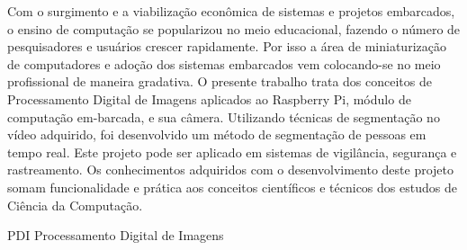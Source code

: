 \documentclass[12pt,oneside,a4paper,chapter=TITLE,section=TITLE,sumario=tradicional]{abntex2}
\begin{document}

\imprimircapa
\imprimirfolhaderosto

\begin{resumo}
Com o surgimento e a viabilização econômica de sistemas e projetos embarcados, o ensino de computação se popularizou no meio educacional, fazendo o número de pesquisadores e usuários crescer rapidamente. Por isso a área de miniaturização de computadores e adoção dos sistemas embarcados vem colocando-se no meio profissional de maneira gradativa. O presente trabalho trata dos conceitos de Processamento Digital de Imagens aplicados ao Raspberry Pi, módulo de computação em-barcada, e sua câmera. Utilizando técnicas de segmentação no vídeo adquirido, foi desenvolvido um método de segmentação de pessoas em tempo real.  Este projeto pode ser aplicado em sistemas de vigilância, segurança e rastreamento. Os conhecimentos adquiridos com o desenvolvimento deste projeto somam funcionalidade e prática aos conceitos científicos e técnicos dos estudos de Ciência da Computação.

\end{resumo}

\listadefiguras
\listadequadros

\begin{siglas}
  \item[PDI] Processamento Digital de Imagens
\end{siglas}



\sumario

\textual
\end{document}
